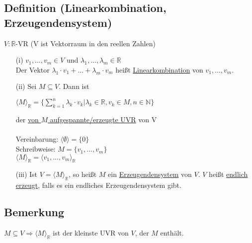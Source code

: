 \documentclass[12pt,titlepage, pdf]{article}
\newcommand{\R}{\mathds{R}}
\newcommand{\uline}[1]{\underline{#1}}
\renewcommand{\>}{\rightarrow}
\renewcommand{\*}{\cdot}
\begin{document}
\subsection{Definition (Linearkombination, Erzeugendensystem)}
$V: \R$-VR (V ist Vektorraum in den reellen Zahlen) \\
\begin{itemize}
	\item[(i)] $v_1, ... , v_m \in V$ und $\lambda_1,...,\lambda_m \in \R$\\ Der Vektor $\lambda_1 \* v_1 + ... + \lambda_m \* v_m$ heißt \uline{Linearkombination} von $v_1,...,v_m$.
	\item[(ii)] Sei $M \subseteq V$. Dann ist
	\begin{center}
		$\langle M \rangle_{\R} = \{ \sum_{k = 1}^{n} \lambda_k \cdot v_k \vert \lambda_k \in \R, v_k \in M, n \in \mathds{N}\}$
	\end{center}
	der \underline{von $M$ aufgespannte/erzeugte UVR} von V \\
	\\
	Vereinbarung: $\langle \emptyset \rangle = \{0\}$\\
	Schreibweise: $M = \{v_1,...,v_m\}$\\
	\noindent\hspace*{22mm}$\langle M \rangle_{\R} = \langle v_1,..., v_m\rangle_{\R} $
	\item[(iii)]
	Ist $V = \langle M \rangle_{\R}$, so heißt $M$ ein \uline{Erzeugendensystem} von $V$. $V$ heißt \uline{endlich erzeugt}, falls es ein endliches Erzeugendensystem gibt.
\end{itemize}
\subsection{Bemerkung}
$M \subseteq V \Rightarrow \langle M \rangle_{\R}$ ist der kleinste UVR von $V$, der $M$ enthält.\\
\end{document}

